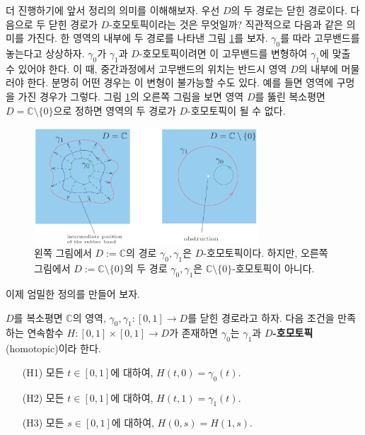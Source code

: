 더 진행하기에 앞서 정리의 의미를 이해해보자.
우선 $D$의 두 경로는 닫힌 경로이다.
다음으로 두 닫힌 경로가 $D$-호모토픽이라는 것은 무엇일까?
직관적으로 다음과 같은 의미를 가진다.
한 영역의 내부에 두 경로를 나타낸 그림 \ref{fig-3-12}를 보자.
$\gamma_0$를 따라 고무밴드를 놓는다고 상상하자.
$\gamma_0$가 $\gamma_1$과 $D$-호모토픽이려면
이 고무밴드를 변형하여 $\gamma_1$에 맞출 수 있어야 한다.
이 때, 중간과정에서 고무밴드의 위치는 반드시 영역 $D$의 내부에 머물러야 한다.
분명히 어떤 경우는 이 변형이 불가능할 수도 있다. 
예를 들면 영역에 구멍을 가진 경우가 그렇다.
그림 \ref{fig-3-12}의 오른쪽 그림을 보면 
영역 $D$를 뚫린 복소평면 $D=\mathbb C\setminus \{0\}$으로 정하면
영역의 두 경로가 $D$-호모토픽이 될 수 없다.

\begin{figure}[!h]
\begin{center}
\includegraphics[width=0.75\textwidth]{./SaltChapter/figs/fig-3-12}
\end{center}
\caption{왼쪽 그림에서 $D:=\mathbb C$의 경로 $\gamma_0, \gamma_1$은 $D$-호모토픽이다.
하지만, 오른쪽 그림에서 $D:=\mathbb C\setminus\{0\}$의 두 경로
$\gamma_0, \gamma_1$은 $\mathbb C\setminus\{0\}$-호모토픽이 아니다.}
\label{fig-3-12}
\end{figure}

이제 엄밀한 정의를 만들어 보자.

\begin{saltdefinition}{}{} \label{def-3-3}
$D$를 복소평면 $\mathbb C$의 영역,
$\gamma_0, \gamma_1 : [0,1] \to D$를 닫힌 경로라고 하자.
다음 조건을 만족하는 연속함수 $H:[0,1]\times[0,1]\to D$가 존재하면
$\gamma_0$는 $\gamma_1$과 {\bf $D$-호모토픽}(homotopic)이라 한다.
\begin{itemize}
\item[(H1)] 모든 $t\in [0,1]$에 대하여, $H(t,0)=\gamma_0(t)$.
\item[(H2)] 모든 $t\in [0,1]$에 대하여, $H(t,1)=\gamma_1(t)$.
\item[(H3)] 모든 $s\in [0,1]$에 대하여, $H(0,s)=H(1,s)$.
\end{itemize}
\end{saltdefinition}

